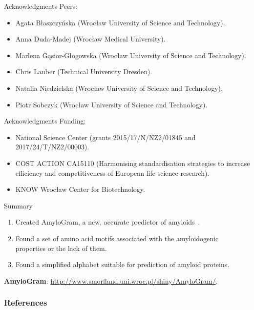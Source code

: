 \documentclass{beamer}\usepackage[]{graphicx}\usepackage[]{color}
\begin{document}
\begin{frame}{Acknowledgments}
Peers:
\begin{itemize}
\item Agata Błaszczyńska (Wrocław University of Science and Technology).
\item Anna Duda-Madej (Wrocław Medical University).
\item Marlena G\k{a}sior-Głogowska (Wrocław University of Science and Technology).
\item Chris Lauber (Technical University Dresden).
\item Natalia Niedzielska (Wrocław University of Science and Technology).
\item Piotr Sobczyk (Wrocław University of Science and Technology).
\end{itemize}

\end{frame}

\begin{frame}{Acknowledgments}
Funding:
\begin{itemize}
\item National Science Center (grants 2015/17/N/NZ2/01845 and 2017/24/T/NZ2/00003).
\item COST ACTION CA15110 (Harmonising standardisation strategies to increase efficiency and competitiveness of European life-science research).
\item KNOW Wrocław Center for Biotechnology.
\end{itemize}

\end{frame}

\begin{frame}{Summary}
\begin{enumerate}
\item Created AmyloGram, a new, accurate predictor of amyloids~\citep{BurdukiewiczAmyloidogenicmotifsrevealed2017}.
\item Found a set of amino acid motifs associated with the amyloidogenic properties or the lack of them.
\item Found a simplified alphabet suitable for prediction of amyloid proteins.
\end{enumerate}

\textbf{AmyloGram}: \url{http://www.smorfland.uni.wroc.pl/shiny/AmyloGram/}.

\end{frame}  


\begin{frame}[allowframebreaks]
        \frametitle{References}
  
  
\end{frame}  
\end{document}
